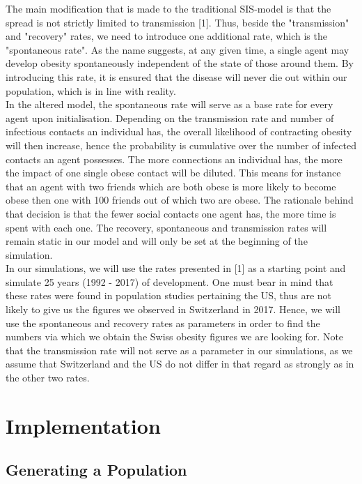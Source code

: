 \documentclass[11pt]{article}
\begin{document}
The main modification that is made to the traditional SIS-model is that the spread is not strictly limited to  transmission [1]. Thus, beside the "transmission" and "recovery" rates, we need to introduce one additional rate, which is the "spontaneous rate". As the name suggests, at any given time, a single agent may develop obesity spontaneously independent of the state of those around them. By introducing this rate, it is ensured that the disease will never die out within our population, which is in line with reality.\\

In the altered model, the spontaneous rate will serve as a base rate for every agent upon initialisation. Depending on the transmission rate and number of infectious contacts an individual has, the overall likelihood of contracting obesity will then increase, hence the probability is cumulative over the number of infected contacts an agent possesses. The more connections an individual has, the more the impact of one single obese contact will be diluted. This means for instance that an agent with two friends which are both obese is more likely to become obese then one with 100 friends out of which two are obese. The rationale behind that decision is that the fewer social contacts one agent has, the more time is spent with each one. The recovery, spontaneous and transmission rates will remain static in our model and will only be set at the beginning of the simulation.
\\

In our simulations, we will use the rates presented in [1] as a starting point and simulate 25 years (1992 - 2017) of development. One must bear in mind that these rates were found in population studies pertaining the US, thus are not likely to give us the figures we observed in Switzerland in 2017. Hence, we will use the spontaneous and recovery rates as parameters in order to find the numbers via which we obtain the Swiss obesity figures we are looking for. Note that the transmission rate will not serve as a parameter in our simulations, as we assume that Switzerland and the US do not differ in that regard as strongly as in the other two rates.



\section{Implementation}

\subsection{Generating a Population}
\end{document}
